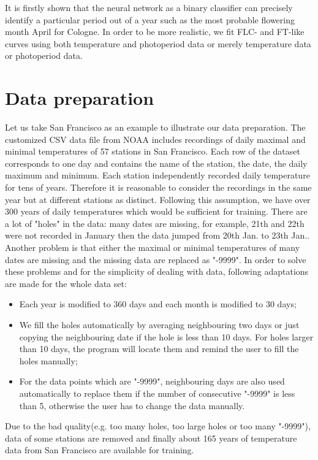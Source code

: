 \documentclass[paper=a4, fontsize=12pt]{scrartcl}	%
\numberwithin{equation}{section}					%
\numberwithin{figure}{section}					%
\numberwithin{table}{section}					%
\begin{document}
It is firstly shown that the neural network as a binary classifier can precisely identify a particular period out of a year such as the most probable flowering month April for Cologne. In order to be more realistic, we fit FLC- and FT-like curves using both temperature and photoperiod data or merely temperature data or photoperiod data. 
\section{Data preparation}
Let us take San Francisco as an example to illustrate our data preparation. The customized CSV data file from NOAA includes recordings of daily maximal and minimal temperatures of 57 stations in San Francisco. Each row of the dataset corresponds to one day and contains the name of the station, the date, the daily maximum and minimum. Each station independently recorded daily temperature for tens of years. Therefore it is reasonable to consider the recordings in the same year but at different stations as distinct. Following this assumption, we have over 300 years of daily temperatures which would be sufficient for training. There are a lot of "holes" in the data: many dates are missing, for example, 21th and 22th were not recorded in January then the data jumped from 20th Jan. to 23th Jan.. Another problem is that either the maximal or minimal temperatures of many dates are missing and the missing data are replaced as "-9999". In order to solve these problems and for the simplicity of dealing with data, following adaptations are made for the whole data set:
\begin{itemize}
\item Each year is modified to 360 days and each month is modified to 30 days;
\item We fill the holes automatically by averaging neighbouring two days or just copying the neighbouring date if the hole is less than 10 days. For holes larger than 10 days, the program will locate them and remind the user to fill the holes manually;
\item For the data points which are "-9999", neighbouring days are also used automatically to replace them if the number of consecutive "-9999" is less than 5, otherwise the user has to change the data manually. 
\end{itemize}
Due to the bad quality(e.g. too many holes, too large holes or too many "-9999"), data of some stations are removed and finally about 165 years of temperature data from San Francisco are available for training. 
\end{document}
